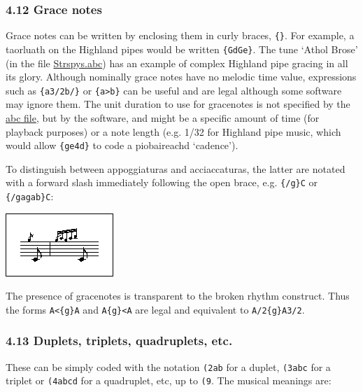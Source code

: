 \documentclass[oneside]{book}
\begin{document}
\hypertarget{grace_notes}{\subsubsection{4.12 Grace
notes}\label{grace_notes}}

Grace notes can be written by enclosing them in curly braces,
\texttt{\{\}}. For example, a taorluath on the Highland pipes would be
written \texttt{\{GdGe\}}. The tune `Athol Brose' (in the file
\protect\hyperlink{strspysabc}{Strspys.abc}) has an example of complex
Highland pipe gracing in all its glory. Although nominally grace notes
have no melodic time value, expressions such as \texttt{\{a3/2b/\}} or
\texttt{\{a\textgreater{}b\}} can be useful and are legal although some
software may ignore them. The unit duration to use for gracenotes is not
specified by the \protect\hyperlink{abc_file_definition}{abc file}, but
by the software, and might be a specific amount of time (for playback
purposes) or a note length (e.g. 1/32 for Highland pipe music, which
would allow \texttt{\{ge4d\}} to code a piobaireachd `cadence').

To distinguish between appoggiaturas and acciaccaturas, the latter are
notated with a forward slash immediately following the open brace, e.g.
\texttt{\{/g\}C} or \texttt{\{/gagab\}C}:

\href{/wiki/_detail/abc:standard:graces-80.png?id=abc\%3Astandard\%3Av2.1}{\includegraphics{wiki/_media/abc-standard-graces-80.png}}

The presence of gracenotes is transparent to the broken rhythm
construct. Thus the forms \texttt{A\textless{}\{g\}A} and
\texttt{A\{g\}\textless{}A} are legal and equivalent to
\texttt{A/2\{g\}A3/2}.

\hypertarget{duplets_triplets_quadruplets_etc}{\subsubsection{4.13
Duplets, triplets, quadruplets,
etc.}\label{duplets_triplets_quadruplets_etc}}

These can be simply coded with the notation \texttt{(2ab} for a duplet,
\texttt{(3abc} for a triplet or \texttt{(4abcd} for a quadruplet, etc,
up to \texttt{(9}. The musical meanings are:
\end{document}
